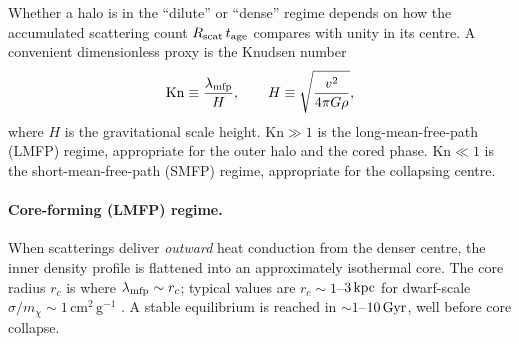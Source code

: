 \documentclass[12pt]{article}
\newcommand{\cmg}{\,\mathrm{cm^2\,g^{-1}}}
\newcommand{\smx}{\sigma/m_\chi}
\newcommand{\Kn}{\mathrm{Kn}}
\newcommand{\mfp}{\lambda_{\rm mfp}}
\begin{document}
Whether a halo is in the ``dilute'' or ``dense'' regime depends on how
the accumulated scattering count $R_{\rm scat}\, t_{\rm age}$ compares
with unity in its centre.  A convenient dimensionless proxy is the
Knudsen number
%
\begin{equation}
  \Kn \equiv \frac{\mfp}{H},
  \qquad
  H \equiv \sqrt{\frac{v^2}{4\pi G\rho}},
\end{equation}
%
where $H$ is the gravitational scale height.  $\Kn\gg 1$ is the
long-mean-free-path (LMFP) regime, appropriate for the outer halo and
the cored phase.  $\Kn\ll 1$ is the short-mean-free-path (SMFP)
regime, appropriate for the collapsing centre.

\paragraph{Core-forming (LMFP) regime.}  When scatterings deliver
\emph{outward} heat conduction from the denser centre, the inner
density profile is flattened into an approximately isothermal core.
The core radius $r_c$ is where $\mfp\sim r_c$; typical values are
$r_c \sim 1$--$3\,{\rm kpc}$ for dwarf-scale $\smx \sim 1\cmg$
\citep{Rocha2013}.  A stable equilibrium is reached in
$\sim 1$--$10\,{\rm Gyr}$, well before core collapse.
\end{document}
